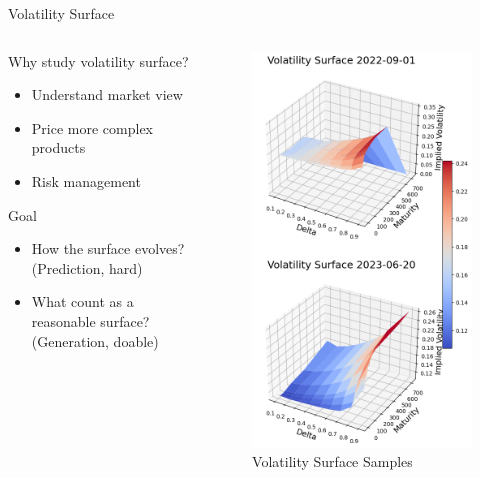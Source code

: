 \documentclass{beamer}
\begin{document}
\begin{frame}{Volatility Surface}
\begin{columns}
    \begin{column}{0.46\textwidth}
        Why study volatility surface?
        \begin{itemize}
            \item Understand market view
            \item Price more complex products
            \item Risk management
        \end{itemize}
        \vspace{0.5cm}
        Goal
        \begin{itemize}
            \item How the surface evolves? (Prediction, hard)
            \item What count as a reasonable surface? (Generation, doable)
        \end{itemize}
    \end{column}
    
    \begin{column}{0.48\textwidth}
    
\begin{figure}
    \centering
    \includegraphics[width=0.65\linewidth]{docs/slides/img/vol_sample.png}
    \caption{Volatility Surface Samples}
    \label{fig:enter-label}
\end{figure}
    \end{column}
\end{columns}

\end{frame}
\end{document}
